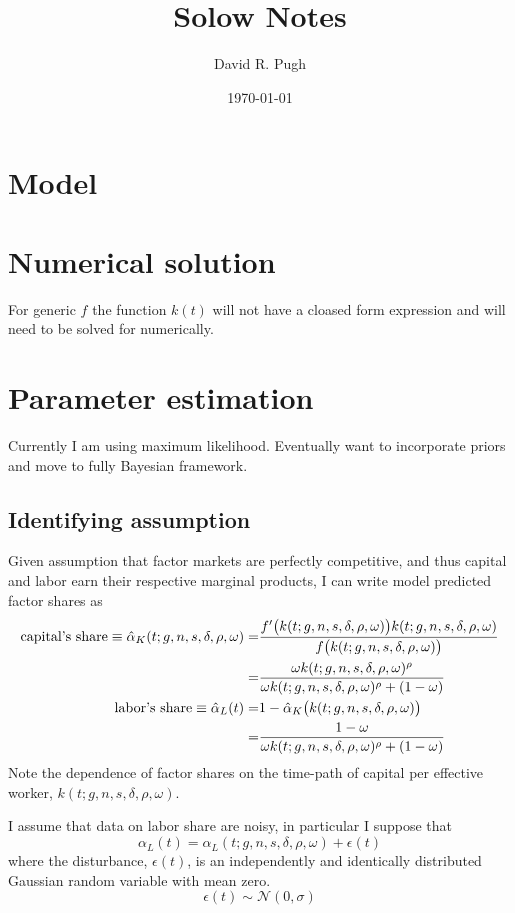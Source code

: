 \documentclass[11pt]{amsart}
\title{Solow Notes}
\author{David R. Pugh}
\date{\today}
\begin{document}
\maketitle

\section{Model}

\section{Numerical solution}
For generic $f$ the function $k(t)$ will not have a cloased form expression and will need to be solved for numerically.

\section{Parameter estimation}
Currently I am using maximum likelihood. Eventually want to incorporate priors and move to fully Bayesian framework.

\subsection{Identifying assumption}
Given assumption that factor markets are perfectly competitive, and thus capital and labor earn their respective marginal products, I can write model predicted factor shares as
\begin{align}
    \text{capital's share} \equiv \hat{\alpha}_K(t; g,n,s,\delta,\rho,\omega) =&\frac{f'\big(k(t; g,n,s,\delta,\rho,\omega)\big)k(t; g,n,s,\delta,\rho,\omega)}{f\big(k(t; g,n,s,\delta,\rho,\omega)\big)} \notag \\
    =& \frac{\omega k(t; g,n,s,\delta,\rho,\omega)^{\rho}}{\omega k(t; g,n,s,\delta,\rho,\omega)^{\rho} + (1 - \omega)} \\
    \text{labor's share} \equiv \hat{\alpha}_L(t) =& 1 - \hat{\alpha}_K\big(k(t; g,n,s,\delta,\rho,\omega)\big) \notag \\
    =& \frac{1-\omega}{\omega k(t; g,n,s,\delta,\rho,\omega)^{\rho} + (1 - \omega)}
\end{align}
Note the dependence of factor shares on the time-path of capital per effective worker, $k(t; g,n,s,\delta,\rho,\omega)$. 

I assume that data on labor share are noisy, in particular I suppose that
\begin{equation}
    \alpha_L(t) = \hat{\alpha}_L(t; g,n,s,\delta,\rho,\omega) + \epsilon(t)
\end{equation}
where the disturbance, $\epsilon(t)$, is an independently and identically distributed Gaussian random variable with mean zero.
\begin{equation}
    \epsilon(t) \sim \mathcal{N}(0, \sigma) 
\end{equation}
\end{document}
